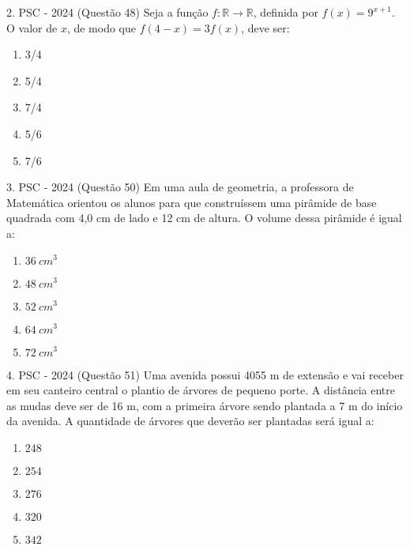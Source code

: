 \documentclass[aspectratio=169]{beamer}
\newif\ifusarcorvermelha
\newcommand{\vermelho}[1]{%
    \ifusarcorvermelha
        {\color{red}#1}%
    \else
        #1%
    \fi
}
\begin{document}
    \begin{frame}{2. PSC  - 2024 (Questão 48)}
        Seja a função $f: \mathbb{R} \to \mathbb{R}$, definida por $f(x)=9^{x+1}$. O valor de $x$, de modo que $f(4-x)=3f(x)$, deve ser:
        
            \begin{enumerate}[a]
                \item {3}/{4}
                \item {5}/{4}
                \item \vermelho{{7}/{4}} %
                \item {5}/{6}
                \item {7}/{6}
            \end{enumerate}
            
    \end{frame}

    \begin{frame}{3. PSC  - 2024 (Questão 50)}
        Em uma aula de geometria, a professora de Matemática orientou os alunos para que construíssem uma pirâmide de base quadrada com 4,0 cm de lado e 12 cm de altura. O volume dessa pirâmide é igual a:

         \begin{enumerate}[a]
                    \item $36 \ cm^{3}$
                    \item $48 \ cm^{3}$
                    \item $52 \ cm^{3}$
                    \item \vermelho{$64 \ cm^{3}$} %
                    \item $72 \ cm^{3}$
                \end{enumerate}        
    \end{frame}

    \begin{frame}{4. PSC  - 2024 (Questão 51)}
        Uma avenida possui 4055 m de extensão e vai receber em seu canteiro central o plantio de árvores de pequeno porte. A distância entre as mudas deve ser de 16 m, com a primeira árvore sendo plantada a 7 m do início da avenida. A quantidade de árvores que deverão ser plantadas será igual a:


         \begin{enumerate}[a]
                    \item $248$
                    \item \vermelho{$254$} %
                    \item $276$
                    \item $320$ 
                    \item $342$
                \end{enumerate}        
    \end{frame}
\end{document}
